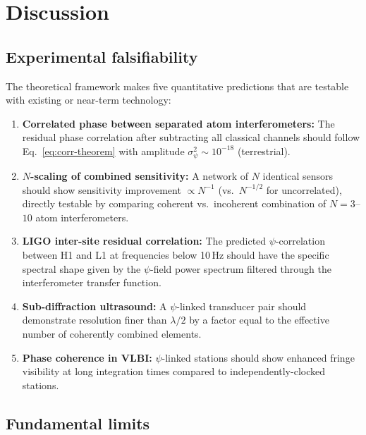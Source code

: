 \documentclass[aps,prl,twocolumn,superscriptaddress,showpacs]{revtex4-2}
\theoremstyle{definition}
\begin{document}
\section{Discussion}\label{sec:discussion}

\subsection{Experimental falsifiability}

The theoretical framework makes five quantitative predictions
that are testable with existing or near-term technology:

\begin{enumerate}
\item \textbf{Correlated phase between separated atom interferometers:}
The residual phase correlation after subtracting all classical channels
should follow Eq.~\eqref{eq:corr-theorem} with amplitude
$\sigma_\psi^2 \sim 10^{-18}$ (terrestrial).

\item \textbf{$N$-scaling of combined sensitivity:}
A network of $N$ identical sensors should show sensitivity improvement
$\propto N^{-1}$ (vs.\ $N^{-1/2}$ for uncorrelated), directly testable
by comparing coherent vs.\ incoherent combination of $N = 3$--$10$
atom interferometers.

\item \textbf{LIGO inter-site residual correlation:}
The predicted $\psi$-correlation between H1 and L1 at frequencies below
10\,Hz should have the specific spectral shape given by the $\psi$-field
power spectrum filtered through the interferometer transfer function.

\item \textbf{Sub-diffraction ultrasound:}
A $\psi$-linked transducer pair should demonstrate resolution finer
than $\lambda/2$ by a factor equal to the effective number of
coherently combined elements.

\item \textbf{Phase coherence in VLBI:}
$\psi$-linked stations should show enhanced fringe visibility at long
integration times compared to independently-clocked stations.
\end{enumerate}

\subsection{Fundamental limits}
\end{document}
